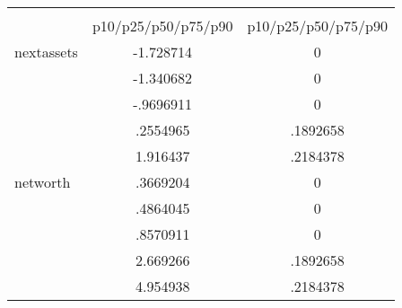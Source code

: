 \begin{tabular}{l*{2}{c}}
\hline\hline
            &\multicolumn{1}{c}{}&\multicolumn{1}{c}{}\\
            &p10/p25/p50/p75/p90&p10/p25/p50/p75/p90\\
\hline
nextassets  &   -1.728714&           0\\
            &   -1.340682&           0\\
            &   -.9696911&           0\\
            &    .2554965&    .1892658\\
            &    1.916437&    .2184378\\
networth    &    .3669204&           0\\
            &    .4864045&           0\\
            &    .8570911&           0\\
            &    2.669266&    .1892658\\
            &    4.954938&    .2184378\\
\hline\hline
\end{tabular}
